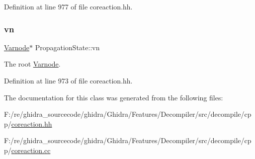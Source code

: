 Definition at line 977 of file coreaction.\+hh.

\mbox{\label{class_propagation_state_ad1e2aa7ef7c3650b04b4bf6541b009f4}} 
\subsubsection{\texorpdfstring{vn}{vn}}
{\footnotesize\ttfamily \mbox{\hyperlink{class_varnode}{Varnode}}$\ast$ Propagation\+State\+::vn}



The root \mbox{\hyperlink{class_varnode}{Varnode}}. 



Definition at line 973 of file coreaction.\+hh.



The documentation for this class was generated from the following files\+:\begin{DoxyCompactItemize}
\item 
F\+:/re/ghidra\+\_\+sourcecode/ghidra/\+Ghidra/\+Features/\+Decompiler/src/decompile/cpp/\mbox{\hyperlink{coreaction_8hh}{coreaction.\+hh}}\item 
F\+:/re/ghidra\+\_\+sourcecode/ghidra/\+Ghidra/\+Features/\+Decompiler/src/decompile/cpp/\mbox{\hyperlink{coreaction_8cc}{coreaction.\+cc}}\end{DoxyCompactItemize}
